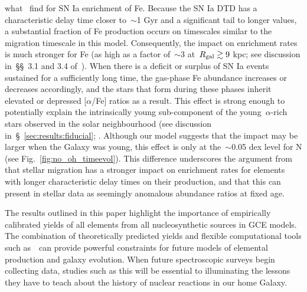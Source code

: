 \documentclass[ms.tex]{subfiles}
\begin{document}
what~\citet{Johnson2021} find for SN Ia enrichment of Fe.
Because the SN Ia DTD has a characteristic delay time closer to~$\sim$1 Gyr
and a significant tail to longer values, a substantial fraction of Fe
production occurs on timescales similar to the migration timescale in this
model.
Consequently, the impact on enrichment rates is much stronger for Fe (as high
as a factor of~$\sim$3 at~$R_\text{gal} \gtrsim 9$ kpc; see discussion in~\S\S~3.1 and
3.4 of~\citealp{Johnson2021}).
When there is a deficit or surplus of SN Ia events sustained for a
sufficiently long time, the gas-phase Fe abundance increases or decreases
accordingly, and the stars that form during these phases inherit elevated or
depressed [$\alpha$/Fe] ratios as a result.
This effect is strong enough to potentially explain the intrinsically young
sub-component of the young~$\alpha$-rich stars observed in the solar
neighbourhood (see discussion in~\S~\ref{sec:results:fiducial};
\citealp{Chiappini2015, Martig2015, Martig2016,
Jofre2016, Yong2016, Izzard2018, SilvaAguirre2018, Warfield2021}.
Although our model suggests that the impact may be larger when the Galaxy was
young, this effect is only at the~$\sim$0.05 dex level for N (see
Fig.~\ref{fig:no_oh_timeevol}).
This difference underscores the argument from~\citet{Johnson2021} that stellar
migration has a stronger impact on enrichment rates for elements with longer
characteristic delay times on their production, and that this can present in
stellar data as seemingly anomalous abundance ratios at fixed age.
\par
The results outlined in this paper highlight the importance of empirically
calibrated yields of all elements from all nucleosynthetic sources in GCE
models.
The combination of theoretically predicted yields and flexible computational
tools such as~\vice~can provide powerful constraints for future models of
elemental production and galaxy evolution.
When future spectroscopic surveys begin collecting data, studies such as this
will be essential to illuminating the lessons they have to teach about the
history of nuclear reactions in our home Galaxy.
\end{document}
